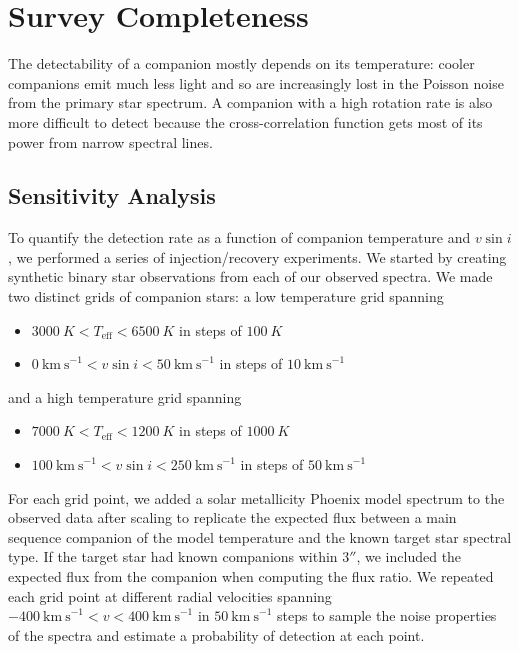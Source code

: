 \documentclass{emulateapj}
\begin{document}
\section{Survey Completeness}
\label{sec:completeness}

The detectability of a companion mostly depends on its temperature: cooler companions emit much less light and so are increasingly lost in the Poisson noise from the primary star spectrum. A companion with a high rotation rate is also more difficult to detect because the cross-correlation function gets most of its power from narrow spectral lines.  

\subsection{Sensitivity Analysis}

To quantify the detection rate as a function of companion temperature and $v\sin{i}$, we performed a series of injection/recovery experiments. We started by creating synthetic binary star observations from each of our observed spectra. We made two distinct grids of companion stars: a low temperature grid spanning

\begin{itemize}
\item $3000\ K < T_\mathrm{eff} < 6500\ K$ in steps of $100\ K$
\item $0\ \mathrm{km\ s}^{-1} < v\sin{i} < 50\ \mathrm{km\ s}^{-1}$ in steps of $10\ \mathrm{km\ s}^{-1}$
\end{itemize}
and a high temperature grid spanning

\begin{itemize}
\item $7000\ K < T_\mathrm{eff} < 1200\ K$ in steps of $1000\ K$
\item $100\ \mathrm{km\ s}^{-1} < v\sin{i} < 250\ \mathrm{km\ s}^{-1}$ in steps of $50\ \mathrm{km\ s}^{-1}$
\end{itemize}
For each grid point, we added a solar metallicity Phoenix model spectrum to the observed data after scaling to replicate the expected flux between a main sequence companion of the model temperature and the known target star spectral type. If the target star had known companions within $3''$, we included the expected flux from the companion when computing the flux ratio. We repeated each grid point at different radial velocities spanning $-400\ \mathrm{km\ s}^{-1} < v < 400\ \mathrm{km\ s}^{-1}$ in $50\ \mathrm{km\ s}^{-1}$ steps to sample the noise properties of the spectra and estimate a probability of detection at each point.
\end{document}
